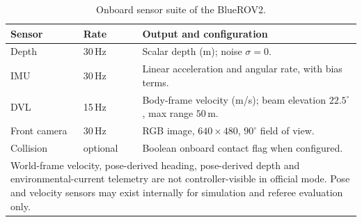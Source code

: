 \begin{table}[t]
\centering
\caption{Onboard sensor suite of the BlueROV2.}
\label{tab:sensors}
\mratablestyle
\begin{tabular}{p{}p{}p{}}
\toprule
Sensor & Rate & Output and configuration \\
\midrule
Depth        & 30\,Hz & Scalar depth (m); noise $\sigma=0$. \\
IMU          & 30\,Hz & Linear acceleration and angular rate, with bias terms. \\
DVL          & 15\,Hz & Body-frame velocity (m/s); beam elevation $22.5^\circ$, max range $50$\,m. \\
Front camera & 30\,Hz & RGB image, $640\times480$, $90^\circ$ field of view. \\
Collision    & optional & Boolean onboard contact flag when configured. \\
\midrule
\multicolumn{3}{p{0.87\columnwidth}}{World-frame velocity, pose-derived heading, pose-derived depth and environmental-current telemetry are not controller-visible in official mode. Pose and velocity sensors may exist internally for simulation and referee evaluation only.} \\
\bottomrule
\end{tabular}
\end{table}
